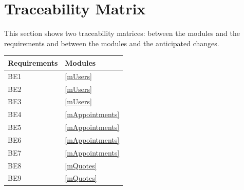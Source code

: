 \documentclass[12pt, titlepage]{article}
\begin{document}
\newpage

\section{Traceability Matrix} \label{SecTM}

This section shows two traceability matrices: between the modules and the requirements and between
the modules and the anticipated changes.

\begin{longtable}{p{} p{}}
	\toprule
	\textbf{Requirements} & \textbf{Modules}                                                                                                                                \\
	\midrule
	BE1                   & \ref{mUsers}                                                                                                                                    \\
	BE2                   & \ref{mUsers}                                                                                                                                    \\
	BE3                   & \ref{mUsers}                                                                                                                                    \\
	BE4                   & \ref{mAppointments}                                                                                                                             \\
	BE5                   & \ref{mAppointments}                                                                                                                             \\
	BE6                   & \ref{mAppointments}                                                                                                                             \\
	BE7                   & \ref{mAppointments}                                                                                                                             \\
	BE8                   & \ref{mQuotes}                                                                                                                                   \\
	BE9                   & \ref{mQuotes}                                                                                                                                   \\

\end{longtable}
\end{document}
